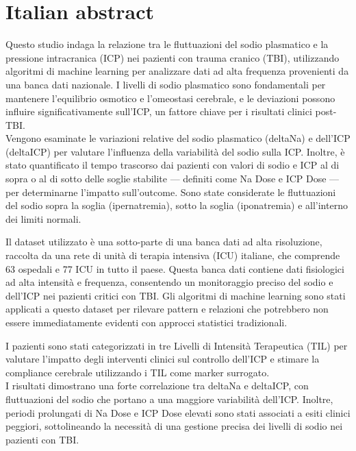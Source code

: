 \chapter*{Italian abstract}

Questo studio indaga la relazione tra le fluttuazioni del sodio plasmatico e la pressione intracranica (ICP) nei pazienti con trauma cranico (TBI), utilizzando algoritmi di machine learning per analizzare dati ad alta frequenza provenienti da una banca dati nazionale. I livelli di sodio plasmatico sono fondamentali per mantenere l’equilibrio osmotico e l’omeostasi cerebrale, e le deviazioni possono influire significativamente sull’ICP, un fattore chiave per i risultati clinici post-TBI.\\

Vengono esaminate le variazioni relative del sodio plasmatico (deltaNa) e dell’ICP (deltaICP) per valutare l’influenza della variabilità del sodio sulla ICP. Inoltre, è stato quantificato il tempo trascorso dai pazienti con valori di sodio e ICP al di sopra o al di sotto delle soglie stabilite — definiti come Na Dose e ICP Dose — per determinarne l’impatto sull'outcome. Sono state considerate le fluttuazioni del sodio sopra la soglia (ipernatremia), sotto la soglia (iponatremia) e all’interno dei limiti normali.

Il dataset utilizzato è una sotto-parte di una banca dati ad alta risoluzione, raccolta da una rete di unità di terapia intensiva (ICU) italiane, che comprende 63 ospedali e 77 ICU in tutto il paese. Questa banca dati contiene dati fisiologici ad alta intensità e frequenza, consentendo un monitoraggio preciso del sodio e dell’ICP nei pazienti critici con TBI. Gli algoritmi di machine learning sono stati applicati a questo dataset per rilevare pattern e relazioni che potrebbero non essere immediatamente evidenti con approcci statistici tradizionali.

I pazienti sono stati categorizzati in tre Livelli di Intensità Terapeutica (TIL) per valutare l’impatto degli interventi clinici sul controllo dell’ICP e stimare la compliance cerebrale utilizzando i TIL come marker surrogato. \\

I risultati dimostrano una forte correlazione tra deltaNa e deltaICP, con fluttuazioni del sodio che portano a una maggiore variabilità dell’ICP. Inoltre, periodi prolungati di Na Dose e ICP Dose elevati sono stati associati a esiti clinici peggiori, sottolineando la necessità di una gestione precisa dei livelli di sodio nei pazienti con TBI.